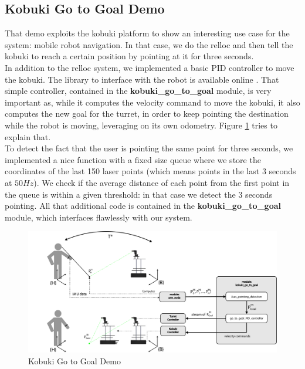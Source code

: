 \subsection{Kobuki Go to Goal Demo}\label{subs:kobukiGoToGoal}
That demo exploits the kobuki platform to show an interesting use case for the system: mobile robot navigation. In that case, we do the relloc and then tell the kobuki to reach a certain position by pointing at it for three seconds.\\
In addition to the relloc system, we implemented a basic PID controller to move the kobuki. The library to interface with the robot is available online \cite{kobuki:ROS}. That simple controller, contained in the \textbf{kobuki\_go\_to\_goal} module, is very important as, while it computes the velocity command to move the kobuki, it also computes the new goal for the turret, in order to keep pointing the destination while the robot is moving, leveraging on its own odometry. Figure \ref{fig:goToGoalDemo} tries to explain that.\\ 
To detect the fact that the user is pointing the same point for three seconds, we implemented a nice function with a fixed size queue where we store the coordinates of the last 150 laser points (which means points in the last $3$ seconds at $50Hz$). We check if the average distance of each point from the first point in the queue is within a given threshold: in that case we detect the 3 seconds pointing. All that additional code is contained in the \textbf{kobuki\_go\_to\_goal} module, which interfaces flawlessly with our system.
\begin{figure}
	\centering
	\includegraphics[width=\textwidth]{img/kgtgSW.png}%
	\caption{Kobuki Go to Goal Demo}
	\label{fig:goToGoalDemo}
\end{figure}
